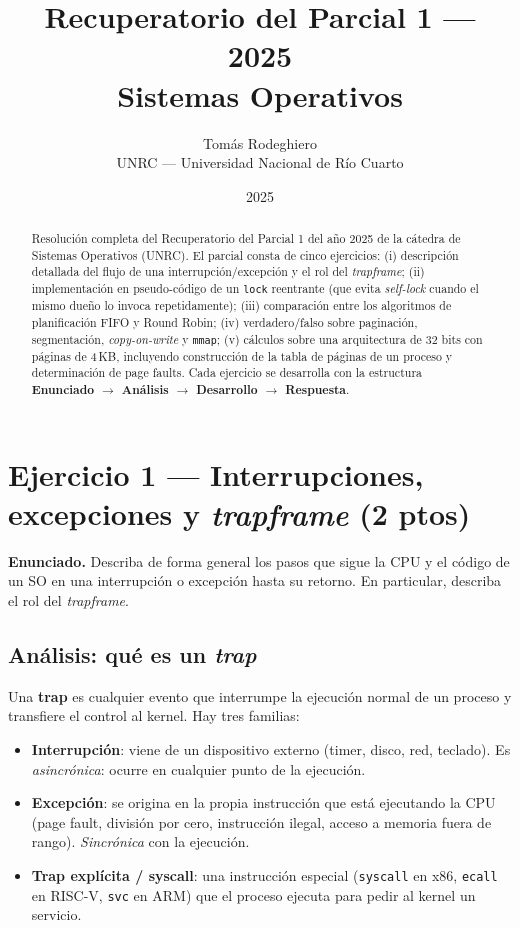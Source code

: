 \documentclass[11pt,a4paper]{article}
\title{
    \vspace{-2.5em}
    \textbf{Recuperatorio del Parcial 1 --- 2025} \\[0.3em]
    \large Sistemas Operativos
}
\author{
    Tomás Rodeghiero \\
    \small UNRC --- Universidad Nacional de Río Cuarto
}
\date{2025}
\begin{document}
\maketitle

\begin{abstract}
\noindent
Resolución completa del Recuperatorio del Parcial 1 del año 2025 de
la cátedra de Sistemas Operativos (UNRC). El parcial consta de cinco
ejercicios: (i) descripción detallada del flujo de una
interrupción/excepción y el rol del \emph{trapframe}; (ii)
implementación en pseudo-código de un \texttt{lock} reentrante (que
evita \emph{self-lock} cuando el mismo dueño lo invoca repetidamente);
(iii) comparación entre los algoritmos de planificación FIFO y Round
Robin; (iv) verdadero/falso sobre paginación, segmentación,
\emph{copy-on-write} y \texttt{mmap}; (v) cálculos sobre una
arquitectura de 32 bits con páginas de 4\,KB, incluyendo construcción
de la tabla de páginas de un proceso y determinación de page faults.
Cada ejercicio se desarrolla con la estructura \textbf{Enunciado
$\to$ Análisis $\to$ Desarrollo $\to$ Respuesta}.
\end{abstract}

\tableofcontents
\bigskip

\section{Ejercicio 1 --- Interrupciones, excepciones y \emph{trapframe} (2 ptos)}

\textbf{Enunciado.} Describa de forma general los pasos que sigue la
CPU y el código de un SO en una interrupción o excepción hasta su
retorno. En particular, describa el rol del \emph{trapframe}.

\subsection*{Análisis: qué es un \emph{trap}}

Una \textbf{trap} es cualquier evento que interrumpe la ejecución
normal de un proceso y transfiere el control al kernel. Hay tres
familias:

\begin{itemize}[leftmargin=*,nosep]
    \item \textbf{Interrupción}: viene de un dispositivo externo
        (timer, disco, red, teclado). Es \emph{asincrónica}: ocurre
        en cualquier punto de la ejecución.
    \item \textbf{Excepción}: se origina en la propia instrucción
        que está ejecutando la CPU (page fault, división por cero,
        instrucción ilegal, acceso a memoria fuera de rango).
        \emph{Sincrónica} con la ejecución.
    \item \textbf{Trap explícita / syscall}: una instrucción
        especial (\texttt{syscall} en x86, \texttt{ecall} en
        RISC-V, \texttt{svc} en ARM) que el proceso ejecuta para
        pedir al kernel un servicio.
\end{itemize}
\end{document}
